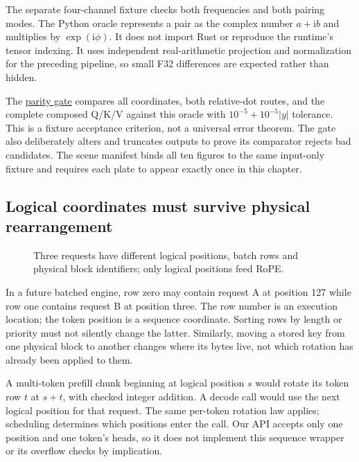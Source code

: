 \documentclass[
  10pt,
]{article}
\begin{document}
The separate four-channel fixture checks both frequencies and both
pairing modes. The Python oracle represents a pair as the complex number
\(a+\mathrm{i}b\) and multiplies by \(\exp(\mathrm{i}\phi)\). It does
not import Rust or reproduce the runtime's tensor indexing. It uses
independent real-arithmetic projection and normalization for the
preceding pipeline, so small F32 differences are expected rather than
hidden.

The
\href{https://github.com/hermonai/inside-the-llm-engine/blob/astra-visual-rewrite/scripts/check-rope-visual-parity.py}{parity
gate} compares all coordinates, both relative-dot routes, and the
complete composed Q/K/V against this oracle with \(10^{-5}+10^{-5}|y|\)
tolerance. This is a fixture acceptance criterion, not a universal error
theorem. The gate also deliberately alters and truncates outputs to
prove its comparator rejects bad candidates. The scene manifest binds
all ten figures to the same input-only fixture and requires each plate
to appear exactly once in this chapter.

\subsection{Logical coordinates must survive physical
rearrangement}\label{logical-coordinates-must-survive-physical-rearrangement}

\begin{figure}[H]\centering\resizebox{\linewidth}{!}{}\caption{Three requests have different logical positions, batch rows and physical block identifiers; only logical positions feed RoPE.}\end{figure}

In a future batched engine, row zero may contain request A at position
127 while row one contains request B at position three. The row number
is an execution location; the token position is a sequence coordinate.
Sorting rows by length or priority must not silently change the latter.
Similarly, moving a stored key from one physical block to another
changes where its bytes live, not which rotation has already been
applied to them.

A multi-token prefill chunk beginning at logical position \(s\) would
rotate its token row \(t\) at \(s+t\), with checked integer addition. A
decode call would use the next logical position for that request. The
same per-token rotation law applies; scheduling determines which
positions enter the call. Our API accepts only one position and one
token's heads, so it does not implement this sequence wrapper or its
overflow checks by implication.
\end{document}

